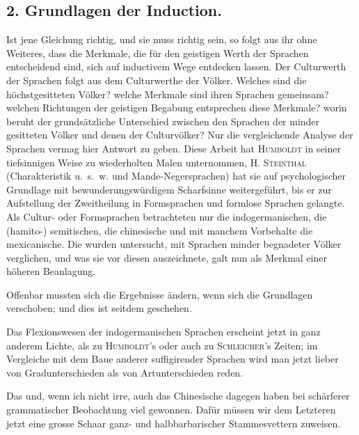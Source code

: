 \subsection*{2. Grundlagen der Induction.}\label{IV.IV.2}

\largerpage[-1]%
Ist jene Gleichung richtig, und sie muss richtig sein, so folgt aus ihr ohne Weiteres, dass die Merkmale, die für den geistigen Werth der Sprachen entscheidend sind, sich auf inductivem Wege entdecken lassen. Der Culturwerth der Sprachen folgt aus dem Culturwerthe der Völker. Welches sind die höchstgesitteten Völker? welche Merkmale sind ihren Sprachen gemeinsam? welchen Richtungen der geistigen Begabung entsprechen diese Merkmale? worin beruht der grundsätzliche Unterschied zwischen den Sprachen der minder gesitteten Völker und denen der Culturvölker? Nur die vergleichende Analyse der Sprachen vermag hier Antwort zu geben. Diese Arbeit hat \textsc{Humboldt} in seiner tiefsinnigen Weise zu wiederholten Malen unternommen, \textsc{H. Steinthal} (Charakteristik u.~s.~w. und Mande-Negersprachen) hat sie auf psychologischer Grundlage mit bewunderungswürdigem Scharfsinne weitergeführt, bis er zur Aufstellung der Zweitheilung in Formsprachen und formlose Sprachen gelangte. Als Cultur- oder Formsprachen betrachteten  nur die indogermanischen, die \mbox{(hamito-)} semitischen, die chinesische und mit manchem Vorbehalte die mexicanische. Die wurden untersucht, mit Sprachen minder begnadeter Völker verglichen, und was sie vor diesen auszeichnete, galt nun als Merkmal einer höheren Beanlagung. 

\label{fp.373} \label{sp.389}

Offenbar mussten sich die Ergebnisse ändern, wenn sich die Grundlagen verschoben; und dies ist seitdem geschehen.

Das Flexionswesen der indogermanischen Sprachen erscheint jetzt in ganz anderem Lichte, als zu \textsc{Humboldt}’s oder auch zu \textsc{Schleicher}’s Zeiten; im Vergleiche mit dem Baue anderer suffigirender Sprachen wird man jetzt lieber von Gradunterschieden als von Artunterschieden reden.

Das  und, wenn ich nicht irre, auch das Chinesische dagegen haben bei schärferer grammatischer Beobachtung viel gewonnen. Dafür müssen wir dem Letzteren jetzt eine grosse Schaar ganz- und halbbarbarischer Stammesvettern zuweisen.

